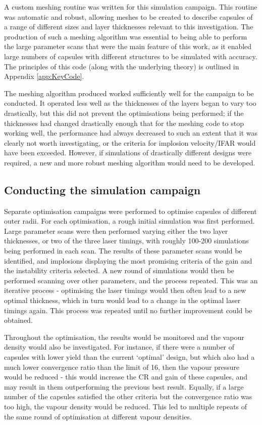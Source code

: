A custom meshing routine was written for this simulation campaign. This routine was automatic and robust, allowing meshes to be created to describe capsules of a range of different sizes and layer thicknesses relevant to this investigation. The production of such a meshing algorithm was essential to being able to perform the large parameter scans that were the main feature of this work, as it enabled large numbers of capsules with different structures to be simulated with accuracy. The principles of this code (along with the underlying theory) is outlined in Appendix \ref{app:KeyCode}.

The meshing algorithm produced worked sufficiently well for the campaign to be conducted. It operated less well as the thicknesses of the layers began to vary too drastically, but this did not prevent the optimisations being performed; if the thicknesses had changed drastically enough that for the meshing code to stop working well, the performance had always decreased to such an extent that it was clearly not worth investigating, or the criteria for implosion velocity/IFAR would have been exceeded. However, if simulations of drastically different designs were required, a new and more robust meshing algorithm would need to be developed.

\subsection{Conducting the simulation campaign}

Separate optimisation campaigns were performed to optimise capsules of different outer radii. For each optimisation, a rough initial simulation was first performed. Large parameter scans were then performed varying either the two layer thicknesses, or two of the three laser timings, with roughly 100-200 simulations being performed in each scan. The results of these parameter scans would be identified, and implosions displaying the most promising criteria of the gain and the instability criteria selected. A new round of simulations would then be performed scanning over other parameters, and the process repeated. This was an iterative process - optimising the laser timings would then often lead to a new optimal thickness, which in turn would lead to a change in the optimal laser timings again. This process was repeated until no further improvement could be obtained.

Throughout the optimisation, the results would be monitored and the vapour density would also be investigated. For instance, if there were a number of capsules with lower yield than the current `optimal' design, but which also had a much lower convergence ratio than the limit of 16, then the vapour pressure would be reduced - this would increase the CR and gain of these capsules, and may result in them outperforming the previous best result. Equally, if a large number of the capsules satisfied the other criteria but the convergence ratio was too high, the vapour density would be reduced. This led to multiple repeats of the same round of optimisation at different vapour densities.

